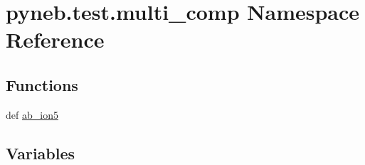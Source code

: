 \hypertarget{namespacepyneb_1_1test_1_1multi__comp}{\section{pyneb.\-test.\-multi\-\_\-comp Namespace Reference}
\label{namespacepyneb_1_1test_1_1multi__comp}
}
\subsection*{Functions}
\begin{DoxyCompactItemize}
\item 
def \hyperlink{namespacepyneb_1_1test_1_1multi__comp_a7030e84e6d88e5cf9f9fcdc4c9cb2a91}{ab\-\_\-ion5}
\end{DoxyCompactItemize}
\subsection*{Variables}
